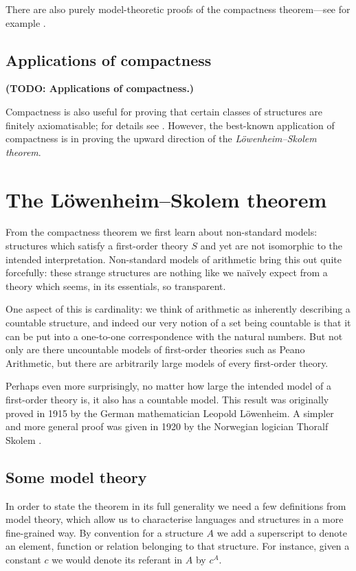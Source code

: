 \documentclass[10pt, a4paper, oneside]{article}
\theoremstyle{definition}
\theoremstyle{remark}
\theoremstyle{plain}
\theoremstyle{plain}
\begin{document}
There are also purely model-theoretic proofs of the compactness theorem---see
for example \citealt[pp. 125--127]{hodges1997}.

\subsection{Applications of compactness}

\textbf{(TODO: Applications of compactness.)}

Compactness is also useful for proving that certain classes of structures are
finitely axiomatisable; for details see \citealt[pp. 114--116]{vdalen2004}.
However, the best-known application of compactness is in proving the upward
direction of the \emph{Löwenheim--Skolem theorem}.


\section{The Löwenheim--Skolem theorem}

From the compactness theorem we first learn about non-standard models:
structures which satisfy a first-order theory $S$ and yet are not isomorphic to
the intended interpretation. Non-standard models of arithmetic bring this out
quite forcefully: these strange structures are nothing like we naïvely expect
from a theory which seems, in its essentials, so transparent.

One aspect of this is cardinality: we think of arithmetic as inherently
describing a countable structure, and indeed our very notion of a set being
countable is that it can be put into a one-to-one correspondence with the
natural numbers. But not only are there uncountable models of first-order
theories such as Peano Arithmetic, but there are arbitrarily large models of
every first-order theory.

Perhaps even more surprisingly, no matter how large the intended model of a
first-order theory is, it also has a countable model. This result was originally
proved in 1915 by the German mathematician Leopold Löwenheim. A simpler and more
general proof was given in 1920 by the Norwegian logician Thoralf Skolem
\citep{lowenheim1915, skolem1920}.

\subsection{Some model theory}

In order to state the theorem in its full generality we need a few definitions
from model theory, which allow us to characterise languages and structures in a
more fine-grained way. By convention for a structure $A$ we add a superscript to
denote an element, function or relation belonging to that structure. For
instance, given a constant $c$ we would denote its referant in $A$ by $c^A$.
\end{document}
